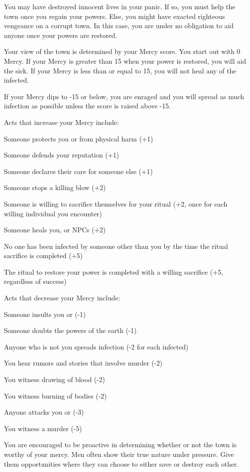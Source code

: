 \documentclass[green]{Pestilence}
\begin{document}
\name{\gMercy{}}

You may have destroyed innocent lives in your panic. If so, you must help the town once you regain your powers. Else, you might have exacted righteous vengeance on a corrupt town. In this case, you are under no obligation to aid anyone once your powers are restored.

Your view of the town is determined by your Mercy score. You start out with 0 Mercy. If your Mercy is greater than 15 when your power is restored, you will aid the sick. If your Mercy is less than or equal to 15, you will not heal any of the infected. 

If your Mercy dips to -15 or below, you are enraged and you will spread as much infection as possible unless the score is raised above -15.

Acts that increase your Mercy include:

\begin{itemz}
	\item Someone protects you or \cShaman{} from physical harm (+1)
	\item Someone defends your reputation (+1)
	\item Someone declares their care for someone else (+1)
	\item Someone stops a killing blow (+2)
	\item Someone is willing to sacrifice themselves for your ritual (+2, once for each willing individual you encounter)
	\item Someone heals you, \cShaman{} or NPCs (+2)
	\item No one has been infected by someone other than you by the time the ritual sacrifice is completed (+5)
	\item The ritual to restore your power is completed with a willing sacrifice (+5, regardless of success)
\end{itemz}

Acts that decrease your Mercy include:

\begin{itemz}
	\item Someone insults you or \cShaman{} (-1)
	\item Someone doubts the powers of the earth (-1)
	\item Anyone who is not you spreads infection (-2 for each infected)
	\item You hear rumors and stories that involve murder (-2)
	\item You witness drawing of blood (-2)
	\item You witness burning of bodies (-2)
	\item Anyone attacks you or \cShaman{} (-3)
	\item You witness a murder (-5)
\end{itemz}

You are encouraged to be proactive in determining whether or not the town is worthy of your mercy. Men often show their true nature under pressure. Give them opportunities where they can choose to either save or destroy each other.
\end{document}

